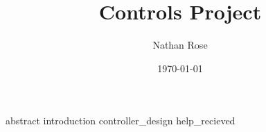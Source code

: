\documentclass[11pt]{article}
\title{Controls Project}
\author{Nathan Rose}
\date{\today}
\begin{document}
\maketitle
{abstract}
{introduction}
{controller_design}
{help_recieved}
\end{document}
